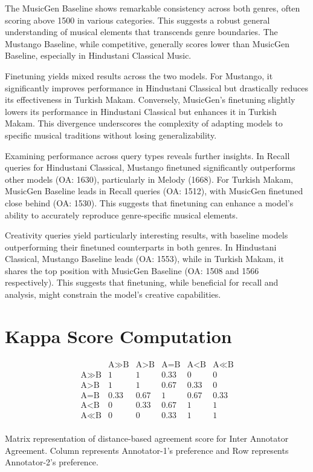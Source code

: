 The MusicGen Baseline shows remarkable consistency across both genres, often scoring above 1500 in various categories. This suggests a robust general understanding of musical elements that transcends genre boundaries. The Mustango Baseline, while competitive, generally scores lower than MusicGen Baseline, especially in Hindustani Classical Music.

Finetuning yields mixed results across the two models. For Mustango, it significantly improves performance in Hindustani Classical but drastically reduces its effectiveness in Turkish Makam. Conversely, MusicGen's finetuning slightly lowers its performance in Hindustani Classical but enhances it in Turkish Makam. This divergence underscores the complexity of adapting models to specific musical traditions without losing generalizability.

Examining performance across query types reveals further insights. In Recall queries for Hindustani Classical, Mustango finetuned significantly outperforms other models (OA: 1630), particularly in Melody (1668). For Turkish Makam, MusicGen Baseline leads in Recall queries (OA: 1512), with MusicGen finetuned close behind (OA: 1530). This suggests that finetuning can enhance a model's ability to accurately reproduce genre-specific musical elements.

Creativity queries yield particularly interesting results, with baseline models outperforming their finetuned counterparts in both genres. In Hindustani Classical, Mustango Baseline leads (OA: 1553), while in Turkish Makam, it shares the top position with MusicGen Baseline (OA: 1508 and 1566 respectively). This suggests that finetuning, while beneficial for recall and analysis, might constrain the model's creative capabilities.

\section{Kappa Score Computation} \label{appendix:kappa_score_compute}
\begin{table}[h!]
    \centering
    \[
    \begin{array}{c|ccccc}
        & \text{A$\gg$B} & \text{A$>$B} & \text{A$=$B} & \text{A$<$B} & \text{A$\ll$B} \\ \hline
    \text{A$\gg$B} & 1 & 1 & 0.33 & 0 & 0 \\
    \text{A$>$B} & 1 & 1 & 0.67 & 0.33 & 0 \\
    \text{A$=$B} & 0.33 & 0.67 & 1 & 0.67 & 0.33 \\
    \text{A$<$B} & 0 & 0.33 & 0.67 & 1 & 1 \\
    \text{A$\ll$B} & 0 & 0 & 0.33 & 1 & 1 \\
    \end{array}
    \]
    \caption{Matrix representation of distance-based agreement score for Inter Annotator Agreement. Column represents Annotator-1's preference and Row represents Annotator-2's preference.}
    \label{tab:iaa_distance}
\end{table}
